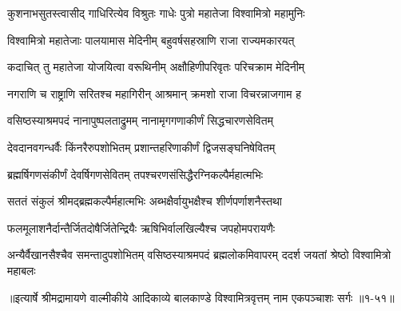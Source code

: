 \twolineshloka
{कुशनाभसुतस्त्वासीद् गाधिरित्येव विश्रुतः}
{गाधेः पुत्रो महातेजा विश्वामित्रो महामुनिः} %

\twolineshloka
{विश्वामित्रो महातेजाः पालयामास मेदिनीम्}
{बहुवर्षसहस्राणि राजा राज्यमकारयत्} %

\twolineshloka
{कदाचित् तु महातेजा योजयित्वा वरूथिनीम्}
{अक्षौहिणीपरिवृतः परिचक्राम मेदिनीम्} %

\twolineshloka
{नगराणि च राष्ट्राणि सरितश्च महागिरीन्}
{आश्रमान् क्रमशो राजा विचरन्नाजगाम ह} %

\twolineshloka
{वसिष्ठस्याश्रमपदं नानापुष्पलताद्रुमम्}
{नानामृगगणाकीर्णं सिद्धचारणसेवितम्} %

\twolineshloka
{देवदानवगन्धर्वैः किंनरैरुपशोभितम्}
{प्रशान्तहरिणाकीर्णं द्विजसङ्घनिषेवितम्} %

\twolineshloka
{ब्रह्मर्षिगणसंकीर्णं देवर्षिगणसेवितम्}
{तपश्चरणसंसिद्धैरग्निकल्पैर्महात्मभिः} %

\twolineshloka
{सततं संकुलं श्रीमद्ब्रह्मकल्पैर्महात्मभिः}
{अब्भक्षैर्वायुभक्षैश्च शीर्णपर्णाशनैस्तथा} %

\twolineshloka
{फलमूलाशनैर्दान्तैर्जितदोषैर्जितेन्द्रियैः}
{ऋषिभिर्वालखिल्यैश्च जपहोमपरायणैः} %

\threelineshloka
{अन्यैर्वैखानसैश्चैव समन्तादुपशोभितम्}
{वसिष्ठस्याश्रमपदं ब्रह्मलोकमिवापरम्}
{ददर्श जयतां श्रेष्ठो विश्वामित्रो महाबलः} %


॥इत्यार्षे श्रीमद्रामायणे वाल्मीकीये आदिकाव्ये बालकाण्डे विश्वामित्रवृत्तम् नाम एकपञ्चाशः सर्गः ॥१-५१॥
